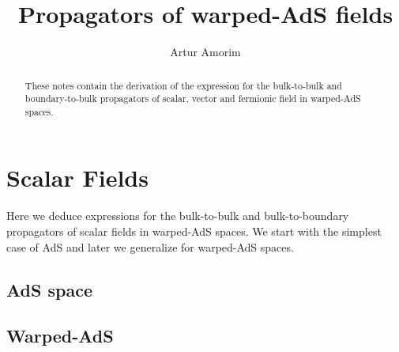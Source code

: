 \documentclass[12pt,a4paper]{article}
\begin{document}
\title{Propagators of warped-AdS fields}
\author{Artur Amorim}

\begin{abstract}
    These notes contain the derivation of the expression for the bulk-to-bulk and boundary-to-bulk propagators of scalar, vector and fermionic field in warped-AdS spaces.
\end{abstract}
\maketitle

\section{Scalar Fields}
Here we deduce expressions for the bulk-to-bulk and bulk-to-boundary propagators of scalar fields in warped-AdS spaces. We start with the simplest case of AdS and later we generalize for warped-AdS spaces.
\subsection{AdS space}
\subsection{Warped-AdS}
\end{document}
